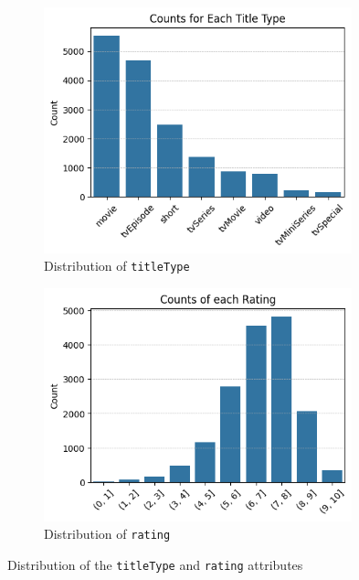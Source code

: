 \begin{figure}[H]
    \centering
    \begin{subfigure}{0.49\textwidth}
        \centering
        \includegraphics[width=0.98\textwidth]{plots/types_count.png}     %
        \caption{Distribution of \texttt{titleType}}
        \captionsetup{width=0.9\linewidth, justification=centering}
        \label{fig:titleType_distrib}
    \end{subfigure}
    \begin{subfigure}{0.5\textwidth}
        \centering
        \includegraphics[width=0.98\textwidth]{plots/rating_distrib.png}     %
        \caption{Distribution of \texttt{rating}}
        \captionsetup{width=0.9\linewidth, justification=centering}
        \label{fig:rating_distrib}
    \end{subfigure}
    \captionsetup{justification=centering}
    \caption{Distribution of the \texttt{titleType} and \texttt{rating} attributes}
    \label{fig:distrib_categorical}
\end{figure}

